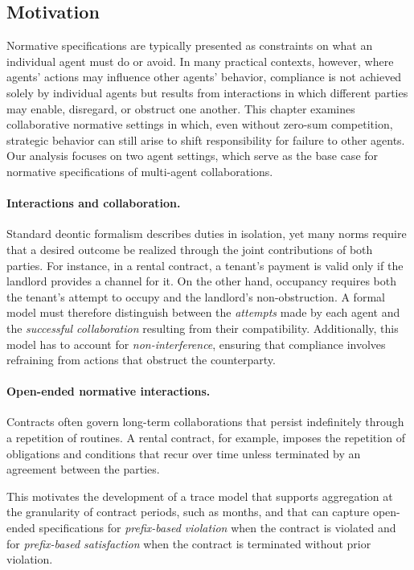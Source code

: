 \subsection{Motivation}

Normative specifications are typically presented as constraints on what an individual agent must do or avoid. In many practical contexts, however, where agents' actions may influence other agents' behavior, compliance is not achieved solely by individual agents but results from interactions in which different parties may enable, disregard, or obstruct one another. This chapter examines collaborative normative settings in which, even without zero-sum competition, strategic behavior can still arise to shift responsibility for failure to other agents. Our analysis focuses on two agent settings, which serve as the base case for normative specifications of multi-agent collaborations. 

\paragraph{Interactions and collaboration.}

Standard deontic formalism describes duties in isolation, yet many norms require that a desired outcome be realized through the joint contributions of both parties. For instance, in a rental contract, a tenant's payment is valid only if the landlord provides a channel for it.  On the other hand, occupancy requires both the tenant's attempt to occupy and the landlord's non-obstruction. A formal model must therefore distinguish between the \emph{attempts} made by each agent and the \emph{successful collaboration} resulting from their compatibility. Additionally, this model has to account for \emph{non-interference}, ensuring that compliance involves refraining from actions that obstruct the counterparty.

\paragraph{Open-ended normative interactions.}

Contracts often govern long-term collaborations that persist indefinitely through a repetition of routines. A rental contract, for example, imposes the repetition of obligations and conditions that recur over time unless terminated by an agreement between the parties. 

This motivates the development of a trace model that supports aggregation at the granularity of contract periods, such as months, and that can capture open-ended specifications for \emph{prefix-based violation} when the contract is violated and for \emph{prefix-based satisfaction} when the contract is terminated without prior violation.

